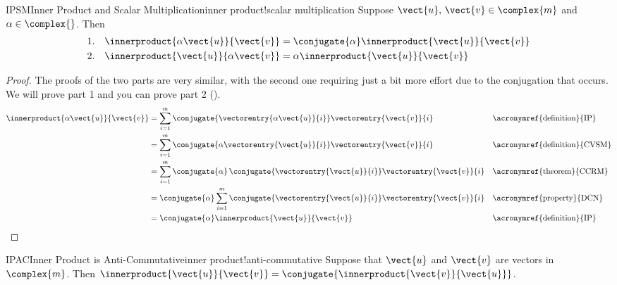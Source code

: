 %
%
\begin{theorem}{IPSM}{Inner Product and Scalar Multiplication}{inner product!scalar multiplication}
Suppose $\vect{u},\,\vect{v}\in\complex{m}$ and $\alpha\in\complex{\null}$.  Then
%
\begin{align*}
\text{1.}\quad\innerproduct{\alpha\vect{u}}{\vect{v}}&=\conjugate{\alpha}\innerproduct{\vect{u}}{\vect{v}}\\
\text{2.}\quad\innerproduct{\vect{u}}{\alpha\vect{v}}&=\alpha\innerproduct{\vect{u}}{\vect{v}}
\end{align*}
%
\end{theorem}
%
\begin{proof}
The proofs of the two parts are very similar, with the second one requiring just a bit more effort due to the conjugation that occurs.  We will prove part 1 and you can prove part 2  ().
%
\begin{align*}
\innerproduct{\alpha\vect{u}}{\vect{v}}
&=\sum_{i=1}^{m}\conjugate{\vectorentry{\alpha\vect{u}}{i}}\vectorentry{\vect{v}}{i}
&&\text{\acronymref{definition}{IP}}\\
%
&=\sum_{i=1}^{m}\conjugate{\alpha\vectorentry{\vect{u}}{i}}\vectorentry{\vect{v}}{i}
&&\text{\acronymref{definition}{CVSM}}\\
%
&=\sum_{i=1}^{m}\conjugate{\alpha}\,\conjugate{\vectorentry{\vect{u}}{i}}\vectorentry{\vect{v}}{i}
&&\text{\acronymref{theorem}{CCRM}}\\
%
&=\conjugate{\alpha}\sum_{i=1}^{m}\conjugate{\vectorentry{\vect{u}}{i}}\vectorentry{\vect{v}}{i}
&&\text{\acronymref{property}{DCN}}\\
%
&=\conjugate{\alpha}\innerproduct{\vect{u}}{\vect{v}}
&&\text{\acronymref{definition}{IP}}
%
\end{align*}
%
\end{proof}
%
\begin{theorem}{IPAC}{Inner Product is Anti-Commutative}{inner product!anti-commutative}
Suppose that $\vect{u}$ and $\vect{v}$ are vectors in $\complex{m}$.  Then
$\innerproduct{\vect{u}}{\vect{v}}=\conjugate{\innerproduct{\vect{v}}{\vect{u}}}$.
\end{theorem}
%
